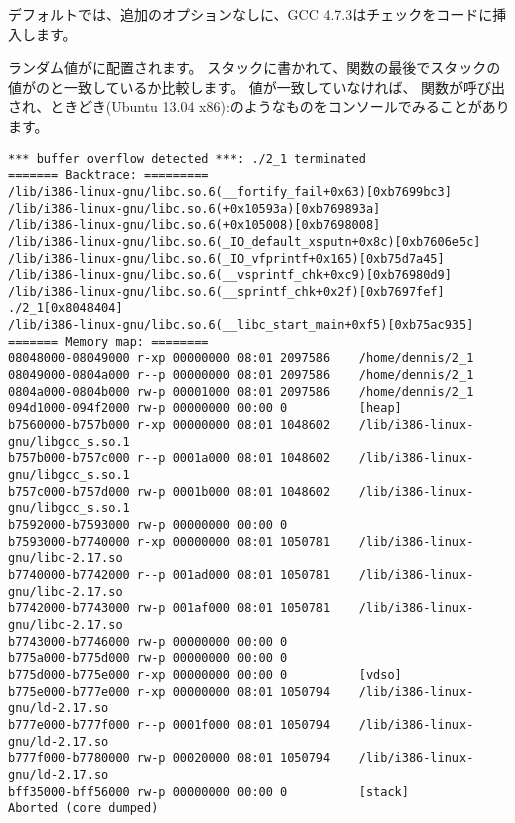 デフォルトでは、追加のオプションなしに、GCC 4.7.3はチェックをコードに挿入します。



ランダム値がに配置されます。
スタックに書かれて、関数の最後でスタックの値がのと一致しているか比較します。
値が一致していなければ、
関数が呼び出され、ときどき(Ubuntu 13.04 x86):のようなものをコンソールでみることがあります。

\begin{lstlisting}
*** buffer overflow detected ***: ./2_1 terminated
======= Backtrace: =========
/lib/i386-linux-gnu/libc.so.6(__fortify_fail+0x63)[0xb7699bc3]
/lib/i386-linux-gnu/libc.so.6(+0x10593a)[0xb769893a]
/lib/i386-linux-gnu/libc.so.6(+0x105008)[0xb7698008]
/lib/i386-linux-gnu/libc.so.6(_IO_default_xsputn+0x8c)[0xb7606e5c]
/lib/i386-linux-gnu/libc.so.6(_IO_vfprintf+0x165)[0xb75d7a45]
/lib/i386-linux-gnu/libc.so.6(__vsprintf_chk+0xc9)[0xb76980d9]
/lib/i386-linux-gnu/libc.so.6(__sprintf_chk+0x2f)[0xb7697fef]
./2_1[0x8048404]
/lib/i386-linux-gnu/libc.so.6(__libc_start_main+0xf5)[0xb75ac935]
======= Memory map: ========
08048000-08049000 r-xp 00000000 08:01 2097586    /home/dennis/2_1
08049000-0804a000 r--p 00000000 08:01 2097586    /home/dennis/2_1
0804a000-0804b000 rw-p 00001000 08:01 2097586    /home/dennis/2_1
094d1000-094f2000 rw-p 00000000 00:00 0          [heap]
b7560000-b757b000 r-xp 00000000 08:01 1048602    /lib/i386-linux-gnu/libgcc_s.so.1
b757b000-b757c000 r--p 0001a000 08:01 1048602    /lib/i386-linux-gnu/libgcc_s.so.1
b757c000-b757d000 rw-p 0001b000 08:01 1048602    /lib/i386-linux-gnu/libgcc_s.so.1
b7592000-b7593000 rw-p 00000000 00:00 0
b7593000-b7740000 r-xp 00000000 08:01 1050781    /lib/i386-linux-gnu/libc-2.17.so
b7740000-b7742000 r--p 001ad000 08:01 1050781    /lib/i386-linux-gnu/libc-2.17.so
b7742000-b7743000 rw-p 001af000 08:01 1050781    /lib/i386-linux-gnu/libc-2.17.so
b7743000-b7746000 rw-p 00000000 00:00 0
b775a000-b775d000 rw-p 00000000 00:00 0
b775d000-b775e000 r-xp 00000000 00:00 0          [vdso]
b775e000-b777e000 r-xp 00000000 08:01 1050794    /lib/i386-linux-gnu/ld-2.17.so
b777e000-b777f000 r--p 0001f000 08:01 1050794    /lib/i386-linux-gnu/ld-2.17.so
b777f000-b7780000 rw-p 00020000 08:01 1050794    /lib/i386-linux-gnu/ld-2.17.so
bff35000-bff56000 rw-p 00000000 00:00 0          [stack]
Aborted (core dumped)
\end{lstlisting}

